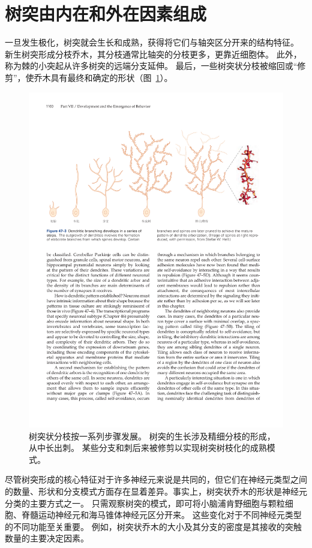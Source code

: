 \section{树突由内在和外在因素组成}

一旦发生极化，树突就会生长和成熟，获得将它们与轴突区分开来的结构特征。
新生树突形成分枝乔木，其分枝通常比轴突的分枝更多，更靠近细胞体。
此外，称为棘的小突起从许多树突的远端分支延伸。
最后，一些树突状分枝被缩回或“修剪”，使乔木具有最终和确定的形状（图~\ref{fig:47_3}）。


\begin{figure}[htbp]
	\centering
	\includegraphics[width=1.0\linewidth]{chap47/fig_47_3}
	\caption{树突状分枝按一系列步骤发展。
		树突的生长涉及精细分枝的形成，从中长出刺。
		某些分支和刺后来被修剪以实现树突树枝化的成熟模式。}
	\label{fig:47_3}
\end{figure}


尽管树突形成的核心特征对于许多神经元来说是共同的，但它们在神经元类型之间的数量、形状和分支模式方面存在显着差异。事实上，树突状乔木的形状是神经元分类的主要方式之一。
只需观察树突的模式，即可将小脑浦肯野细胞与颗粒细胞、脊髓运动神经元和海马锥体神经元区分开来。
这些变化对于不同神经元类型的不同功能至关重要。
例如，树突状乔木的大小及其分支的密度是其接收的突触数量的主要决定因素。


